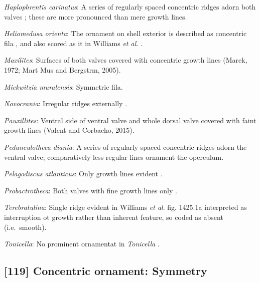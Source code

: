 \documentclass[openany]{book}
\theoremstyle{definition}
\theoremstyle{definition}
\theoremstyle{definition}
\theoremstyle{remark}
\begin{document}
\hypertarget{Haplophrentis_carinatus-coding-118}{}
\emph{Haplophrentis carinatus}: A series of regularly spaced concentric
ridges adorn both valves \citep{Moysiuk2017Hyolithsare}; these are more
pronounced than mere growth lines.

\hypertarget{Heliomedusa_orienta-coding-118}{}
\emph{Heliomedusa orienta}: The ornament on shell exterior is described
as concentric fila \citep[P.43]{Chen2007Reinterpretationof}, and also
scored as it in Williams \emph{et al}.
\citeyearpar[pp.160--163]{Williams2000LinguliformeaCraniiformea}.

\hypertarget{Maxilites-coding-118}{}
\emph{Maxilites}: Surfaces of both valves covered with concentric growth
lines (Marek, 1972; Mart Mus and Bergstrm, 2005).

\hypertarget{Mickwitzia_muralensis-coding-118}{}
\emph{Mickwitzia muralensis}: Symmetric fila.

\hypertarget{Novocrania-coding-118}{}
\emph{Novocrania}: Irregular ridges externally
\citep{Williams2000LinguliformeaCraniiformea}.

\hypertarget{Pauxillites-coding-118}{}
\emph{Pauxillites}: Ventral side of ventral valve and whole dorsal valve
covered with faint growth lines (Valent and Corbacho, 2015).

\hypertarget{Pedunculotheca_diania-coding-118}{}
\emph{Pedunculotheca diania}: A series of regularly spaced concentric
ridges adorn the ventral valve; comparatively less regular lines
ornament the operculum.

\hypertarget{Pelagodiscus_atlanticus-coding-118}{}
\emph{Pelagodiscus atlanticus}: Only growth lines evident
\citep{Williams2000LinguliformeaCraniiformea}.

\hypertarget{Probactrotheca-coding-118}{}
\emph{Probactrotheca}: Both valves with fine growth lines only
\citep{Valent2012}.

\hypertarget{Terebratulina-coding-118}{}
\emph{Terebratulina}: Single ridge evident in Williams \emph{et al}.
\citeyearpar{Williams2006Rhynchonelliformeapart} fig. 1425.1a
interpreted as interruption ot growth rather than inherent feature, so
coded as absent (i.e.~smooth).

\hypertarget{Tonicella-coding-118}{}
\emph{Tonicella}: No prominent ornamentat in \emph{Tonicella}
\citep{Connors2012}.

\subsection*{{[}119{]} Concentric ornament:
Symmetry}\label{concentric-ornament-symmetry}
\end{document}
